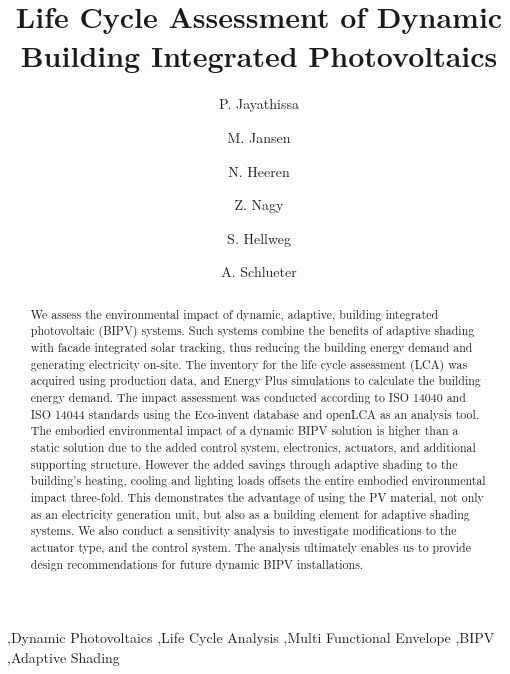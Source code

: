 \documentclass[preprint,12pt]{elsarticle} %
\begin{document}
\begin{frontmatter}

\title{Life Cycle Assessment of Dynamic Building Integrated Photovoltaics} 

\author[ita]{P. Jayathissa }
\address[ita]{Architecture and Building Systems, Institute of Technology in Architecture, Department of Architecture,\\ ETH Zurich, Switzerland} 

\author[ita]{M. Jansen}

\author[baug]{N. Heeren}
\address[baug]{Ecological System Design, Institute of Environmental Engineering,\\ ETH Zurich, Switzerland}

\author[ita]{Z. Nagy}

\author[baug]{S. Hellweg}


\author[ita]{A. Schlueter  }



\begin{abstract}
We assess the environmental impact of dynamic, adaptive, building integrated photovoltaic (BIPV) systems. Such systems combine the benefits of adaptive shading with facade integrated solar tracking, thus reducing the building energy demand and generating electricity on-site. The inventory for the life cycle assessment (LCA) was acquired using production data, and Energy Plus simulations to calculate the building energy demand. The impact assessment was conducted according to ISO 14040 and ISO 14044 standards using the Eco-invent database and openLCA as an analysis tool. The embodied environmental impact of a dynamic BIPV solution is higher than a static solution due to the added control system, electronics, actuators, and additional supporting structure. However the added savings through adaptive shading to the building's heating, cooling and lighting loads offsets the entire embodied environmental impact three-fold. This demonstrates the advantage of using the PV material, not only as an electricity generation unit, but also as a building element for adaptive shading systems. We also conduct a sensitivity analysis to investigate modifications to the actuator type, and the control system. The analysis ultimately enables us to provide design recommendations for future dynamic BIPV installations. 

\end{abstract}

\begin{keyword}
\sep Dynamic Photovoltaics \sep Life Cycle Analysis \sep Multi Functional Envelope \sep BIPV \sep Adaptive Shading
\end{keyword}

\end{frontmatter}
\end{document}
